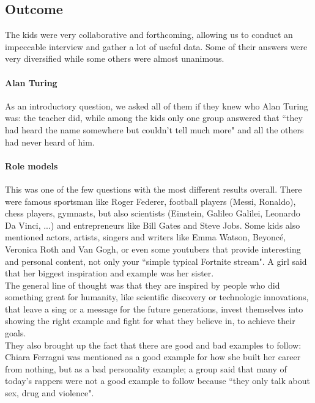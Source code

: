 \documentclass[12pt]{scrartcl}
\begin{document}
	\subsection*{Outcome}
		The kids were very collaborative and forthcoming, allowing us to conduct an impeccable interview and gather a lot of useful data. Some of their answers were very diversified while some others were almost unanimous.
		
		\paragraph{Alan Turing} As an introductory question, we asked all of them if they knew who Alan Turing was: the teacher did, while among the kids only one group answered that ``they had heard the name somewhere but couldn't tell much more" and all the others had never heard of him. 
		
		\paragraph{Role models} This was one of the few questions with the most different results overall. There were famous sportsman like Roger Federer, football players (Messi, Ronaldo), chess players, gymnasts, but also scientists (Einstein, Galileo Galilei, Leonardo Da Vinci, ...) and entrepreneurs like Bill Gates and Steve Jobs. Some kids also mentioned actors, artists, singers and writers like Emma Watson, Beyoncé, Veronica Roth and Van Gogh, or even some youtubers that provide interesting and personal content, not only your ``simple typical Fortnite stream". A girl said that her biggest inspiration and example was her sister.\\
		The general line of thought was that they are inspired by people who did something great for humanity, like scientific discovery or technologic innovations, that leave a sing or a message for the future generations, invest themselves into showing the right example and fight for what they believe in, to achieve their goals.\\
		They also brought up the fact that there are good and bad examples to follow: Chiara Ferragni was mentioned as a good example for how she built her career from nothing, but as a bad personality example; a group said that many of today's rappers were not a good example to follow because ``they only talk about sex, drug and violence".
		
\end{document}
